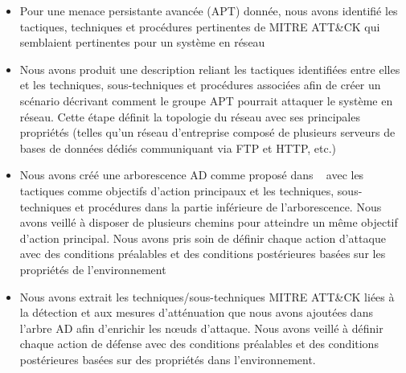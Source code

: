 \begin{itemize}
  \item Pour une menace persistante avancée (APT) donnée, nous avons identifié les tactiques, techniques et procédures pertinentes de MITRE ATT\&CK qui semblaient pertinentes pour un système en réseau

  \item Nous avons produit une description reliant les tactiques identifiées entre elles et les techniques, sous-techniques et procédures associées afin de créer un scénario décrivant comment le groupe APT pourrait attaquer le système en réseau. Cette étape définit la topologie du réseau avec ses principales propriétés
        (telles qu'un réseau d'entreprise composé de plusieurs serveurs de bases de données dédiés communiquant via FTP et HTTP, etc.)

  \item Nous avons créé une arborescence AD comme proposé dans ~\cite{BKordy2010} avec les tactiques comme objectifs d'action principaux et les techniques, sous-techniques et procédures dans la partie inférieure de l'arborescence. Nous avons veillé à disposer de plusieurs chemins pour atteindre un même objectif d'action principal. Nous avons pris soin de définir chaque action d'attaque avec des conditions préalables et des conditions postérieures basées sur les propriétés de l'environnement

  \item Nous avons extrait les techniques/sous-techniques MITRE ATT\&CK liées à la détection et aux mesures d'atténuation que nous avons ajoutées dans l'arbre AD afin d'enrichir les nœuds d'attaque. Nous avons veillé à définir chaque action de défense avec des conditions préalables et des conditions postérieures basées sur des propriétés dans l'environnement.


\end{itemize}
